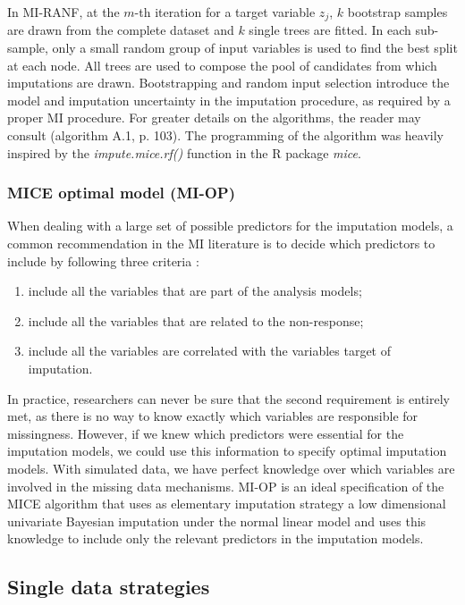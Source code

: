 	In MI-RANF, at the $m$-th iteration for a target variable $z_j$, $k$ bootstrap samples are drawn from the complete 
	dataset and $k$ single trees are fitted.
	In each sub-sample, only a small random group of input variables is used to find the best split at each node.
	All trees are used to compose the pool of candidates from which imputations are drawn.
	Bootstrapping and random input selection introduce the model and imputation uncertainty in the imputation procedure,
	as required by a proper MI procedure.
	For greater details on the algorithms, the reader may consult \cite{dooveEtAl:2014} (algorithm A.1, p. 103).
	The programming of the algorithm was heavily inspired by the \emph{impute.mice.rf()} function in the 
	R package \emph{mice}.

\subsubsection{MICE optimal model (MI-OP)}
	When dealing with a large set of possible predictors for the imputation models, a common recommendation in the MI 
	literature is to decide which predictors to include by following three criteria \citep[p. 168]{vanBuuren:2012}:
	\begin{enumerate}

	\item include all the variables that are part of the analysis models;
	\item include all the variables that are related to the non-response;
	\item include all the variables are correlated with the variables target of imputation.

	\end{enumerate}

	In practice, researchers can never be sure that the second requirement is entirely met, as there is no way to know exactly 
	which variables are responsible for missingness.
	However, if we knew which predictors were essential for the imputation models, we could use this information to specify 
	optimal imputation models.
	With simulated data, we have perfect knowledge over which variables are involved in the missing data mechanisms.
	MI-OP is an ideal specification of the MICE algorithm that uses as elementary imputation strategy a low dimensional 
	univariate Bayesian imputation under the normal linear model and uses this knowledge to include only the relevant 
	predictors in the imputation models.
	
\subsection{Single data strategies}

